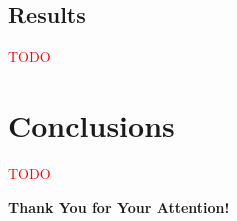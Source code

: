 \documentclass[aspectratio=169, 12pt]{beamer}
\begin{document}
    \subsection{Results}
    \begin{frame}{}
        \textcolor{red}{TODO}
    \end{frame}

    \section{Conclusions}

    \begin{frame}{}
        \textcolor{red}{TODO}
    \end{frame}

    \begin{frame}[plain]{}
        \vspace{2cm}
        \begin{minipage}[t][\baselineskip]{\textwidth}
            {
                \center
                \Large\bf Thank You for Your Attention! \par
            }
        \end{minipage}
    \end{frame}
\end{document}
